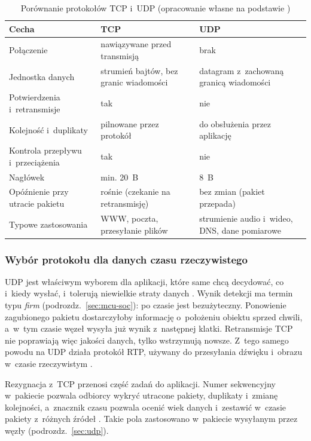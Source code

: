 \begin{table}[htbp]
\centering
\caption{Porównanie protokołów TCP i~UDP (opracowanie własne na
podstawie \cite{rfc768,rfc9293,kurose_2021})}
\label{tab:tcp-udp}
\begin{tabularx}{\textwidth}{>{\raggedright\arraybackslash}p{3.6cm}XX}
\toprule
\textbf{Cecha} & \textbf{TCP} & \textbf{UDP} \\
\midrule
Połączenie & nawiązywane przed transmisją & brak \\
Jednostka danych & strumień bajtów, bez granic wiadomości
& datagram z~zachowaną granicą wiadomości \\
Potwierdzenia i~retransmisje & tak & nie \\
Kolejność i~duplikaty & pilnowane przez protokół
& do obsłużenia przez aplikację \\
Kontrola przepływu i~przeciążenia & tak & nie \\
Nagłówek & min. 20~B & 8~B \\
Opóźnienie przy utracie pakietu & rośnie (czekanie na retransmisję)
& bez zmian (pakiet przepada) \\
Typowe zastosowania & WWW, poczta, przesyłanie plików
& strumienie audio i~wideo, DNS, dane pomiarowe \\
\bottomrule
\end{tabularx}
\end{table}

\subsubsection*{Wybór protokołu dla danych czasu rzeczywistego}

UDP jest właściwym wyborem dla aplikacji, które same chcą decydować, co
i~kiedy wysłać, i~tolerują niewielkie straty danych \cite{kurose_2021}.
Wynik detekcji ma termin typu \textit{firm}
(podrozdz.~\ref{sec:mcu-soc}): po czasie jest bezużyteczny. Ponowienie
zagubionego pakietu dostarczyłoby informację o~położeniu obiektu sprzed
chwili, a~w~tym czasie węzeł wysyła już wynik z~następnej klatki.
Retransmisje TCP nie poprawiają więc jakości danych, tylko wstrzymują
nowsze. Z~tego samego powodu na UDP działa protokół RTP, używany do
przesyłania dźwięku i~obrazu w~czasie rzeczywistym \cite{rfc3550}.

Rezygnacja z~TCP przenosi część zadań do aplikacji. Numer sekwencyjny
w~pakiecie pozwala odbiorcy wykryć utracone pakiety, duplikaty i~zmianę
kolejności, a~znacznik czasu pozwala ocenić wiek danych i~zestawić
w~czasie pakiety z~różnych źródeł \cite{rfc3550}. Takie pola zastosowano
w~pakiecie wysyłanym przez węzły (podrozdz.~\ref{sec:udp}).

